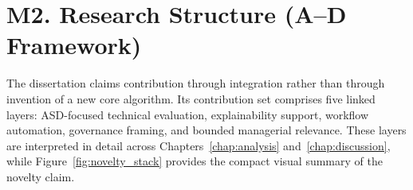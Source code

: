 \fi %


\section*{M2. Research Structure (A--D Framework)}
\label{sec:appm_research_structure}
\label{sec:contributions}

The dissertation claims contribution through integration rather than through invention of a new core algorithm. Its contribution set comprises five linked layers: ASD-focused technical evaluation, explainability support, workflow automation, governance framing, and bounded managerial relevance. These layers are interpreted in detail across Chapters~\ref{chap:analysis} and~\ref{chap:discussion}, while Figure~\ref{fig:novelty_stack} provides the compact visual summary of the novelty claim.

\label{tab:contribution_declaration}


%


